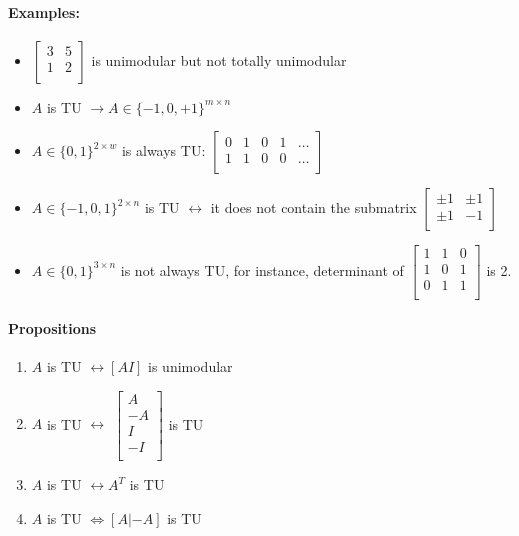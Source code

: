 \documentclass[main]{subfiles}
\begin{document}
\paragraph{Examples:}
\begin{itemize}
\item
$\begin{bmatrix}
3 & 5\\
1 & 2 \\
\end{bmatrix}$ is unimodular but not totally unimodular
\item $A$ is TU $\rightarrow A \in \{-1, 0, +1\}^{m \times n}$
\item $A \in \{0, 1\}^{2 \times w}$ is always TU: 
$\begin{bmatrix}
0 & 1 & 0 & 1 & \dots \\
1 & 1 & 0 & 0 & \dots \\
\end{bmatrix}$
\item $A \in \{-1, 0, 1\}^{2 \times n}$ is TU $\leftrightarrow$ it does not
contain the submatrix 
$\begin{bmatrix}
\pm 1 & \pm 1 \\
\pm 1 & -1  \\
\end{bmatrix}$
\item $A \in \{0,1\}^{3 \times n}$ is not always TU, for instance, determinant
of 
$\begin{bmatrix}
1 & 1 & 0 \\
1 & 0 & 1 \\
0 & 1 & 1 \\
\end{bmatrix}$ is 2.
\end{itemize}

\paragraph{Propositions}
\begin{enumerate}
\item $A$ is TU $\leftrightarrow [AI]$ is unimodular
\item $A$ is TU $\leftrightarrow$
$\begin{bmatrix}
A \\
-A \\
I \\
-I \\
\end{bmatrix}$ is TU
\item $A$ is TU $\leftrightarrow A^{T}$ is TU
\item $A$ is TU $\iff [A |-A]$ is TU
\end{enumerate}
\end{document}
